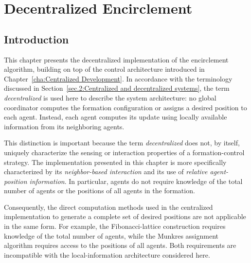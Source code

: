 

%

\chapter{Decentralized Encirclement}
\label{cha:Decentralized Development}

\glsresetall

\section{Introduction} \label{sec.5:Introduction}

This chapter presents the decentralized implementation of the encirclement algorithm, building on top of the control architecture introduced in Chapter~\ref{cha:Centralized Development}. In accordance with the terminology discussed in Section~\ref{sec.2:Centralized and decentralized systems}, the term \emph{decentralized} is used here to describe the system architecture: no global coordinator computes the formation configuration or assigns a desired position to each agent. Instead, each agent computes its update using locally available information from its neighboring agents.

This distinction is important because the term \emph{decentralized} does not, by itself, uniquely characterize the sensing or interaction properties of a formation-control strategy. The implementation presented in this chapter is more specifically characterized by its \emph{neighbor-based interaction} and its use of \emph{relative agent-position information}. In particular, agents do not require knowledge of the total number of agents or the positions of all agents in the formation.

Consequently, the direct computation methods used in the centralized implementation to generate a complete set of desired positions are not applicable in the same form. For example, the Fibonacci-lattice construction requires knowledge of the total number of agents, while the Munkres assignment algorithm requires access to the positions of all agents. Both requirements are incompatible with the local-information architecture considered here.

